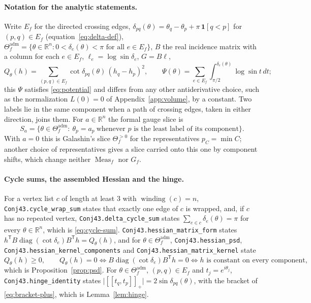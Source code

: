\documentclass[11pt]{article}
\theoremstyle{definition}
\DeclareMathOperator{\Meas}{Meas}
\newcommand{\R}{\mathbb{R}}
\newcommand{\Thef}{\Theta_f^{>0}}
\newcommand{\Theadm}{\Theta_f^{\mathrm{adm}}}
\begin{document}
\paragraph{Notation for the analytic statements.}
Write $E_f$ for the directed crossing edges, $\delta_{pq}(\theta)=\theta_q-\theta_p+\pi\,\mathbf1[q<p]$
for $(p,q)\in E_f$ (equation~\eqref{eq:delta-def}), $\Theadm=\{\theta\in\R^n:0<\delta_e(\theta)<\pi
\text{ for all }e\in E_f\}$, $B$ the real incidence matrix with a column for each $e\in E_f$,
$\ell_e=\log\sin\delta_e$, $G=B\ell$,
\[
 Q_\theta(h)=\sum_{(p,q)\in E_f}\cot\delta_{pq}(\theta)\,(h_q-h_p)^2,\qquad
 \Psi(\theta)=\sum_{e\in E_f}\int_{\pi/2}^{\delta_e(\theta)}\log\sin t\,dt ;
\]
this $\Psi$ satisfies \eqref{eq:potential} and differs from any other antiderivative choice, such as
the normalization $L(0)=0$ of Appendix~\ref{app:volume}, by a constant. Two labels lie in the same component when a path of crossing edges, taken in either
direction, joins them. For $a\in\R^n$ the formal gauge slice is
\[
 S_a=\{\theta\in\Theadm:\ \theta_p=a_p\ \text{whenever $p$ is the least label of its component}\}.
\]
With $a=0$ this is Galashin's slice $\Thef$ \cite[eq.~(4.3)]{Galashin} for the representatives
$p_C=\min C$; another choice of representatives gives a slice carried onto this one by component
shifts, which change neither $\Meas_f$ nor $G_f$.

\paragraph{Cycle sums, the assembled Hessian and the hinge.}
For a vertex list $c$ of length at least $3$ with $\operatorname{winding}(c)=n$,
\texttt{Conj43.\allowbreak cycle\_\allowbreak wrap\_\allowbreak sum} states that exactly one edge of $c$ is wrapped, and, if $c$ has no
repeated vertex, \texttt{Conj43.\allowbreak delta\_\allowbreak cycle\_\allowbreak sum} states $\sum_{e\in c}\delta_e(\theta)=\pi$ for every
$\theta\in\R^n$, which is \eqref{eq:cycle-sum}. \texttt{Conj43.\allowbreak hessian\_\allowbreak matrix\_\allowbreak form} states
$h^{\mathsf T}B\operatorname{diag}(\cot\delta_e)B^{\mathsf T}h=Q_\theta(h)$, and for
$\theta\in\Theadm$, \texttt{Conj43.\allowbreak hessian\_\allowbreak psd}, \texttt{Conj43.\allowbreak hessian\_\allowbreak kernel\_\allowbreak components} and
\texttt{Conj43.\allowbreak hessian\_\allowbreak matrix\_\allowbreak kernel} state
\[
 Q_\theta(h)\ge0,\qquad
 Q_\theta(h)=0\iff B\operatorname{diag}(\cot\delta_e)B^{\mathsf T}h=0
 \iff h\text{ is constant on every component},
\]
which is Proposition~\ref{prop:psd}. For $\theta\in\Theadm$, $(p,q)\in E_f$ and $t_j=e^{i\theta_j}$,
\texttt{Conj43.\allowbreak hinge\_\allowbreak identity} states $\lvert[\![t_q,t_p]\!]_+\rvert=2\sin\delta_{pq}(\theta)$, with the
bracket of \eqref{eq:bracket-plus}, which is Lemma~\ref{lem:hinge}.
\end{document}
